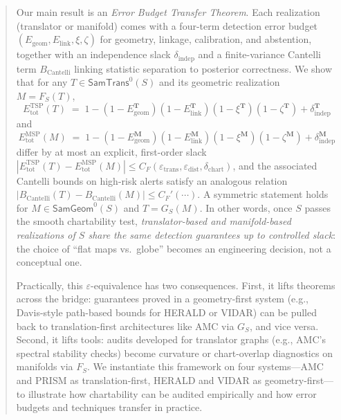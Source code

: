 \documentclass[11pt]{article}
\newcommand{\SamTrans}{\mathsf{SamTrans}}
\newcommand{\SamGeom}{\mathsf{SamGeom}}
\begin{document}
\begin{abstract}
Our main result is an \emph{Error Budget Transfer Theorem}. Each realization (translator or manifold) 
comes with a four-term detection error budget 
$(E_{\mathrm{geom}}, E_{\mathrm{link}}, \xi, \zeta)$ for geometry, linkage, calibration, and abstention, 
together with an independence slack $\delta_{\mathrm{indep}}$ and a finite-variance Cantelli term 
$B_{\mathrm{Cantelli}}$ linking statistic separation to posterior correctness. We show that for any 
$T \in \SamTrans^0(S)$ and its geometric realization $M = F_S(T)$,
\[
E_{\mathrm{tot}}^{\mathrm{TSP}}(T)
\;=\;
1 - (1 - E_{\mathrm{geom}}^{\mathbf{T}})(1 - E_{\mathrm{link}}^{\mathbf{T}})
      (1 - \xi^{\mathbf{T}})(1 - \zeta^{\mathbf{T}})
      + \delta_{\mathrm{indep}}^{\mathbf{T}}
\]
and
\[
E_{\mathrm{tot}}^{\mathrm{MSP}}(M)
\;=\;
1 - (1 - E_{\mathrm{geom}}^{\mathbf{M}})(1 - E_{\mathrm{link}}^{\mathbf{M}})
      (1 - \xi^{\mathbf{M}})(1 - \zeta^{\mathbf{M}})
      + \delta_{\mathrm{indep}}^{\mathbf{M}}
\]
differ by at most an explicit, first-order slack 
$|E_{\mathrm{tot}}^{\mathrm{TSP}}(T) - E_{\mathrm{tot}}^{\mathrm{MSP}}(M)| \le C_F(\varepsilon_{\mathrm{trans}}, \varepsilon_{\mathrm{dist}}, \delta_{\mathrm{chart}})$, 
and the associated Cantelli bounds on high-risk alerts satisfy an analogous relation 
$|B_{\mathrm{Cantelli}}(T) - B_{\mathrm{Cantelli}}(M)| \le C_F'(\cdots)$. A symmetric statement holds 
for $M \in \SamGeom^0(S)$ and $T = G_S(M)$. In other words, once $S$ passes the smooth chartability 
test, \emph{translator-based and manifold-based realizations of $S$ share the same detection guarantees 
up to controlled slack}: the choice of “flat maps vs.\ globe” becomes an engineering decision, not a 
conceptual one.

Practically, this $\varepsilon$-equivalence has two consequences. First, it lifts theorems across the 
bridge: guarantees proved in a geometry-first system (e.g., Davis-style path-based bounds for HERALD 
or VIDAR) can be pulled back to translation-first architectures like AMC via $G_S$, and vice versa. 
Second, it lifts tools: audits developed for translator graphs (e.g., AMC’s spectral stability checks) 
become curvature or chart-overlap diagnostics on manifolds via $F_S$. We instantiate this framework 
on four systems—AMC and PRISM as translation-first, HERALD and VIDAR as geometry-first—to illustrate 
how chartability can be audited empirically and how error budgets and techniques transfer in practice.
\end{abstract}


\end{document}

